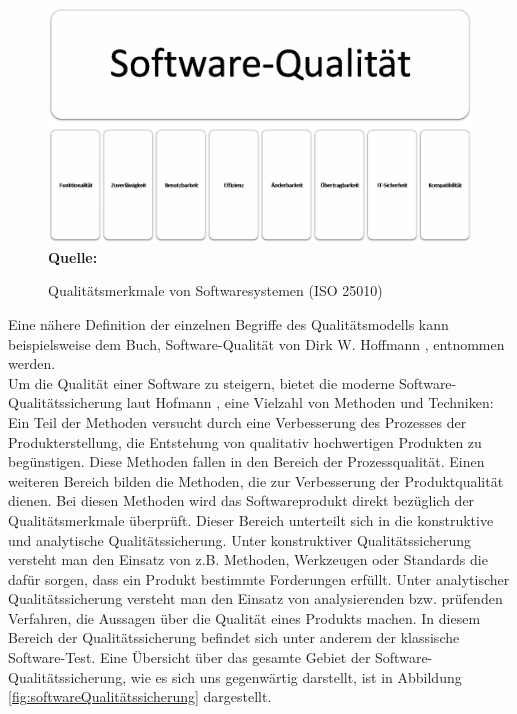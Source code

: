 \begin{figure}[htb]
  \centering  
  \includegraphics[scale=0.7]{img/softwarequalitaet25010.png}\\
  \footnotesize\sffamily\textbf{Quelle:} \cite{iso/iec_iso/iec_2011}
  \caption{Qualitätsmerkmale von Softwaresystemen (ISO 25010)}
  \label{fig:qualitaetsmerkmaleVonSoftwaresystemen}
\end{figure}
Eine nähere Definition der einzelnen Begriffe des Qualitätsmodells kann beispielsweise dem Buch, Software-Qualität von Dirk W. Hoffmann \cite[S.7 ff.]{hoffmann_software-qualitat_2013}, entnommen werden.\\
Um die Qualität einer Software zu steigern, bietet die moderne Software-Qualitätssicherung laut Hofmann \cite[vgl. S.19 ff.]{hoffmann_software-qualitat_2013}, eine Vielzahl von Methoden und Techniken:
Ein Teil der Methoden versucht durch eine Verbesserung des Prozesses der Produkterstellung, die Entstehung von qualitativ hochwertigen Produkten zu begünstigen. Diese Methoden fallen in den Bereich der Prozessqualität.
Einen weiteren Bereich bilden die Methoden, die zur Verbesserung der Produktqualität dienen. Bei diesen Methoden wird das Softwareprodukt direkt bezüglich der Qualitätsmerkmale überprüft. Dieser Bereich unterteilt sich in die konstruktive und analytische Qualitätssicherung. Unter konstruktiver Qualitätssicherung versteht man den Einsatz von z.B. Methoden, Werkzeugen oder Standards die
dafür sorgen, dass ein Produkt bestimmte Forderungen erfüllt. 
Unter analytischer Qualitätssicherung versteht man den Einsatz von analysierenden bzw. prüfenden Verfahren, die Aussagen
über die Qualität eines Produkts machen.
In diesem Bereich der Qualitätssicherung befindet sich unter anderem der klassische Software-Test. Eine Übersicht über das gesamte Gebiet der Software-Qualitätssicherung, wie es sich uns gegenwärtig darstellt, ist in Abbildung \ref{fig:softwareQualitätssicherung} dargestellt. 
